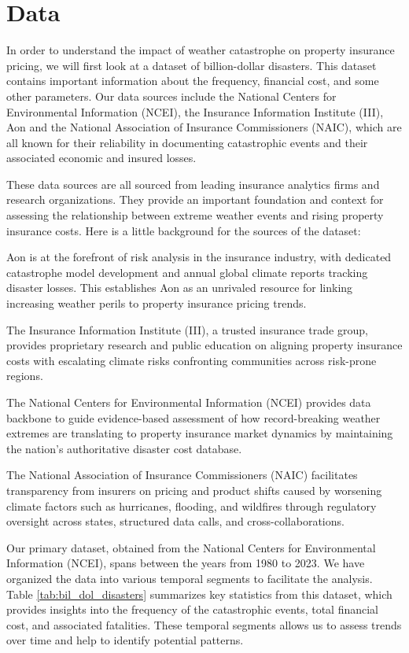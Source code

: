 \documentclass[12pt]{article}
\begin{document}
\section{Data}
\label{sec:data}
In order to understand the impact of weather catastrophe on property insurance pricing, we will first look at a dataset of 
billion-dollar disasters. This dataset contains important information about the frequency, financial cost, and some other parameters. 
Our data sources include the National Centers for Environmental Information (NCEI)\cite{ncei}, the Insurance Information Institute 
(III)\cite{iii}, Aon\cite{aon} and the National Association of Insurance Commissioners (NAIC)\cite{naic}, which are all known for their 
reliability in documenting catastrophic events and their associated economic and insured losses.

These data sources are all sourced from leading insurance analytics firms and research organizations. They provide an important foundation and 
context for assessing the relationship between extreme weather events and rising property insurance costs. Here is a little background
for the sources of the dataset:

Aon is at the forefront of risk analysis in the insurance industry, with dedicated catastrophe model development and annual global 
climate reports tracking disaster losses. This establishes Aon as an unrivaled resource for linking increasing weather perils to 
property insurance pricing trends.

The Insurance Information Institute (III), a trusted insurance trade group, provides proprietary research and public education on aligning 
property insurance costs with escalating climate risks confronting communities across risk-prone regions.

The National Centers for Environmental Information (NCEI) provides data backbone to guide evidence-based assessment of how record-breaking 
weather extremes are translating to property insurance market dynamics by maintaining the nation's authoritative disaster cost 
database.

The National Association of Insurance Commissioners (NAIC) facilitates transparency from insurers on pricing and product shifts caused by 
worsening climate factors such as hurricanes, flooding, and wildfires through regulatory oversight across states, structured data 
calls, and cross-collaborations.

Our primary dataset, obtained from the National Centers for Environmental Information (NCEI)\cite{ncei}, spans between the years from 
1980 to 2023. We have organized the data into various temporal segments to facilitate the analysis. Table \ref{tab:bil_dol_disasters} 
summarizes key statistics from this dataset, which provides insights into the frequency of the catastrophic events, total financial cost, and 
associated fatalities. These temporal segments allows us to assess trends over time and help to identify potential patterns.
\end{document}
